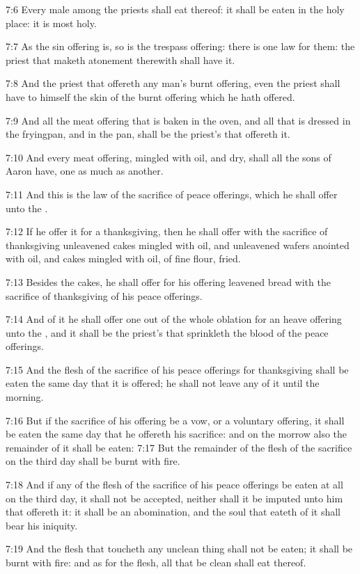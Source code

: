 7:6 Every male among the priests shall eat thereof: it shall be eaten
in the holy place: it is most holy.

7:7 As the sin offering is, so is the trespass offering: there is one
law for them: the priest that maketh atonement therewith shall have
it.

7:8 And the priest that offereth any man's burnt offering, even the
priest shall have to himself the skin of the burnt offering which he
hath offered.

7:9 And all the meat offering that is baken in the oven, and all that
is dressed in the fryingpan, and in the pan, shall be the priest's
that offereth it.

7:10 And every meat offering, mingled with oil, and dry, shall all the
sons of Aaron have, one as much as another.

7:11 And this is the law of the sacrifice of peace offerings, which he
shall offer unto the \LORD.

7:12 If he offer it for a thanksgiving, then he shall offer with the
sacrifice of thanksgiving unleavened cakes mingled with oil, and
unleavened wafers anointed with oil, and cakes mingled with oil, of
fine flour, fried.

7:13 Besides the cakes, he shall offer for his offering leavened bread
with the sacrifice of thanksgiving of his peace offerings.

7:14 And of it he shall offer one out of the whole oblation for an
heave offering unto the \LORD, and it shall be the priest's that
sprinkleth the blood of the peace offerings.

7:15 And the flesh of the sacrifice of his peace offerings for
thanksgiving shall be eaten the same day that it is offered; he shall
not leave any of it until the morning.

7:16 But if the sacrifice of his offering be a vow, or a voluntary
offering, it shall be eaten the same day that he offereth his
sacrifice: and on the morrow also the remainder of it shall be eaten:
7:17 But the remainder of the flesh of the sacrifice on the third day
shall be burnt with fire.

7:18 And if any of the flesh of the sacrifice of his peace offerings
be eaten at all on the third day, it shall not be accepted, neither
shall it be imputed unto him that offereth it: it shall be an
abomination, and the soul that eateth of it shall bear his iniquity.

7:19 And the flesh that toucheth any unclean thing shall not be eaten;
it shall be burnt with fire: and as for the flesh, all that be clean
shall eat thereof.


